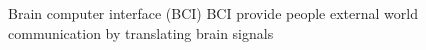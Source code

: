 \documentclass[aspectratio=169]{beamer}
\let\oldcite\cite %
\renewcommand{\cite}[1]{{\tiny\oldcite{#1}}}
\begin{document}
\begin{frame}{Brain computer interface (BCI)}
    \centering
    BCI provide people external world communication by translating brain signals~\cite{khan2020review}
    \begin{figure}[!ht]
        \centering
    \end{figure}

\end{frame}
\end{document}

